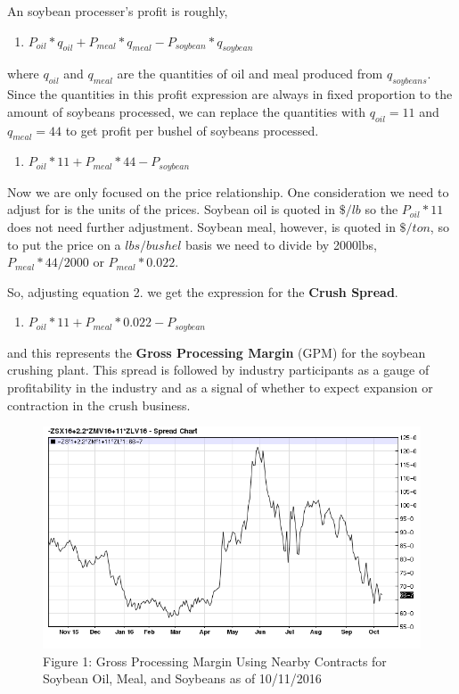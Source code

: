 \documentclass[]{book}
\providecommand{\tightlist}{%
  \setlength{\itemsep}{0pt}\setlength{\parskip}{0pt}}
\theoremstyle{definition}
\theoremstyle{definition}
\theoremstyle{remark}
\begin{document}
An soybean processer's profit is roughly,

\begin{enumerate}
\def\labelenumi{\arabic{enumi}.}
\tightlist
\item
  \(P_{oil}*q_{oil} + P_{meal}*q_{meal} - P_{soybean}*q_{soybean}\)
\end{enumerate}

where \(q_{oil}\) and \(q_{meal}\) are the quantities of oil and meal
produced from \(q_{soybeans}\). Since the quantities in this profit
expression are always in fixed proportion to the amount of soybeans
processed, we can replace the quantities with \(q_{oil} = 11\) and
\(q_{meal} = 44\) to get profit per bushel of soybeans processed.

\begin{enumerate}
\def\labelenumi{\arabic{enumi}.}
\setcounter{enumi}{1}
\tightlist
\item
  \(P_{oil}*11 + P_{meal}*44 - P_{soybean}\)
\end{enumerate}

Now we are only focused on the price relationship. One consideration we
need to adjust for is the units of the prices. Soybean oil is quoted in
\(\$/lb\) so the \(P_{oil}*11\) does not need further adjustment.
Soybean meal, however, is quoted in \(\$/ton\), so to put the price on a
\(lbs/bushel\) basis we need to divide by 2000lbs, \(P_{meal}*44/2000\)
or \(P_{meal}*0.022\).

So, adjusting equation 2. we get the expression for the \textbf{Crush
Spread}.

\begin{enumerate}
\def\labelenumi{\arabic{enumi}.}
\setcounter{enumi}{2}
\tightlist
\item
  \(P_{oil}*11 + P_{meal}*0.022 - P_{soybean}\)
\end{enumerate}

and this represents the \textbf{Gross Processing Margin} (GPM) for the
soybean crushing plant. This spread is followed by industry participants
as a gauge of profitability in the industry and as a signal of whether
to expect expansion or contraction in the crush business.

\begin{figure}[htbp]
\centering
\includegraphics{images/barchart_crush_spread.png}
\caption{Figure 1: Gross Processing Margin Using Nearby Contracts for
Soybean Oil, Meal, and Soybeans as of 10/11/2016}
\end{figure}
\end{document}
